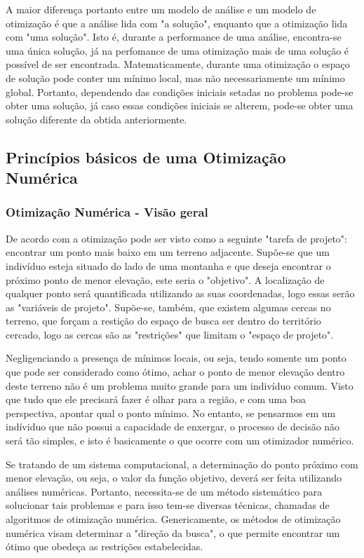  A maior diferença portanto entre um modelo de análise e um modelo de otimização é que a análise lida com "a solução", enquanto que a otimização lida com "uma solução". Isto é, durante a performance de uma análise, encontra-se uma única solução, já na perfomance de uma otimização mais de uma solução é possível de ser encontrada. Matematicamente, durante uma otimização o espaço de solução pode conter um mínimo local, mas não necessariamente um mínimo global. Portanto, dependendo das condições iniciais setadas no problema pode-se obter uma solução, já caso essas condições iniciais se alterem, pode-se obter uma solução diferente da obtida anteriormente.

 \subsection{Princípios básicos de uma Otimização Numérica}
 \subsubsection{Otimização Numérica - Visão geral}
De acordo com \cite{moore1994msc} a otimização pode ser visto como a seguinte "tarefa de projeto": encontrar um ponto mais baixo em um terreno adjacente. Supõe-se que um indivíduo esteja situado do lado de uma montanha e que deseja encontrar o próximo ponto de menor elevação, este seria o "objetivo". A localização de qualquer ponto será quantificada utilizando as suas coordenadas, logo essas serão as "variáveis de projeto". Supõe-se, também, que existem algumas cercas no terreno, que forçam a restição do espaço de busca ser dentro do território cercado, logo as cercas são as "restrições" que limitam o "espaço de projeto".

Negligenciando a presença de mínimos locais, ou seja, tendo somente um ponto que pode ser considerado como ótimo, achar o ponto de menor elevação dentro deste terreno não é um problema muito grande para um indivíduo comum. Visto que tudo que ele precisará fazer é olhar para a região, e com uma boa perspectiva, apontar qual o ponto mínimo.
No entanto, se pensarmos em um indíviduo que não possui a capacidade de enxergar, o processo de decisão não será tão simples, e isto é basicamente o que ocorre com um otimizador numérico.

Se tratando de um sistema computacional, a determinação do ponto próximo com menor elevação, ou seja, o valor da função objetivo, deverá ser feita utilizando análises numéricas. Portanto, necessita-se de um método sistemático para solucionar tais problemas e para isso tem-se diversas técnicas, chamadas de algoritmos de otimização numérica. Genericamente, os métodos de otimização numérica visam determinar a "direção da busca", o que permite encontrar um ótimo que obedeça as restrições estabelecidas.

